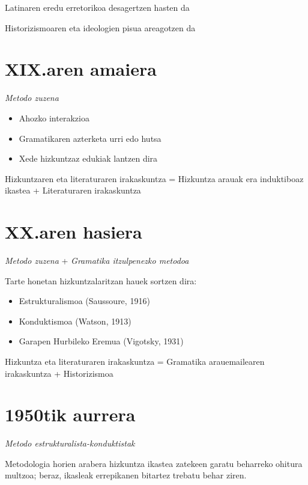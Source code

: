 \documentclass[
]{book}
\providecommand{\tightlist}{%
  \setlength{\itemsep}{0pt}\setlength{\parskip}{0pt}}
\begin{document}
Latinaren eredu erretorikoa desagertzen hasten da

Historizismoaren eta ideologien pisua areagotzen da

\hypertarget{xix.aren-amaiera}{%
\section{XIX.aren amaiera}\label{xix.aren-amaiera}}

\emph{Metodo zuzena}

\begin{itemize}
\tightlist
\item
  Ahozko interakzioa
\item
  Gramatikaren azterketa urri edo hutsa
\item
  Xede hizkuntzaz edukiak lantzen dira
\end{itemize}

Hizkuntzaren eta literaturaren irakaskuntza = Hizkuntza arauak era induktiboaz ikastea + Literaturaren irakaskuntza

\hypertarget{xx.aren-hasiera}{%
\section{XX.aren hasiera}\label{xx.aren-hasiera}}

\emph{Metodo zuzena} + \emph{Gramatika itzulpenezko metodoa}

Tarte honetan hizkuntzalaritzan hauek sortzen dira:

\begin{itemize}
\tightlist
\item
  Estrukturalismoa (Saussoure, 1916)
\item
  Konduktismoa (Watson, 1913)
\item
  Garapen Hurbileko Eremua (Vigotsky, 1931)
\end{itemize}

Hizkuntza eta literaturaren irakaskuntza = Gramatika arauemailearen irakaskuntza + Historizismoa

\hypertarget{tik-aurrera}{%
\section{1950tik aurrera}\label{tik-aurrera}}

\emph{Metodo estrukturalista-konduktistak}

Metodologia horien arabera hizkuntza ikastea zatekeen garatu beharreko ohitura multzoa; beraz, ikasleak errepikanen bitartez trebatu behar ziren.
\end{document}
